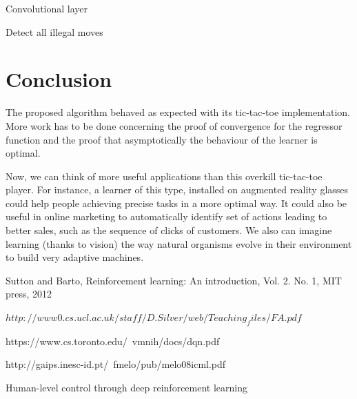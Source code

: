 \documentclass[letterpaper, 10.5 pt, conference]{ieeeconf}
\begin{document}
Convolutional layer

Detect all illegal moves

\section{Conclusion}

The proposed algorithm behaved as expected with its tic-tac-toe implementation. More work has to be done concerning the proof of convergence for the regressor function and the proof that asymptotically the behaviour of the learner is optimal.

Now, we can think of more useful applications than this overkill tic-tac-toe player. For instance, a learner of this type, installed on augmented reality glasses could help people achieving precise tasks in a more optimal way. It could also be useful in online marketing to automatically identify set of actions leading to better sales, such as the sequence of clicks of customers. We also can imagine learning (thanks to vision) the way natural organisms evolve in their environment to build very adaptive machines.

\addtolength{\textheight}{-12cm}   %

\begin{thebibliography}{99}

 Sutton and Barto, Reinforcement learning: An introduction, Vol. 2. No. 1, MIT press, 2012

 $http://www0.cs.ucl.ac.uk/staff/D.Silver/web/Teaching_files/FA.pdf$

 https://www.cs.toronto.edu/~vmnih/docs/dqn.pdf

 http://gaips.inesc-id.pt/~fmelo/pub/melo08icml.pdf

 Human-level control through deep reinforcement learning

\end{thebibliography}
\end{document}

